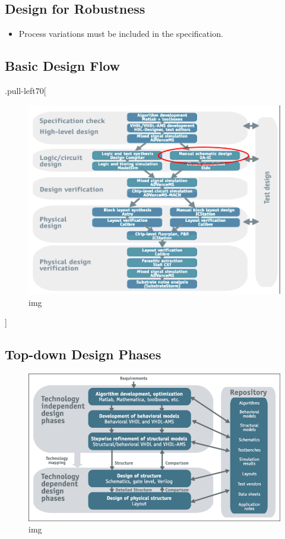 \documentclass[
]{article}
\providecommand{\tightlist}{%
  \setlength{\itemsep}{0pt}\setlength{\parskip}{0pt}}
\begin{document}
\hypertarget{design-for-robustness}{%
\subsection{Design for Robustness}\label{design-for-robustness}}

\begin{itemize}
\tightlist
\item
  Process variations must be included in the specification.
\end{itemize}

\hypertarget{basic-design-flow}{%
\subsection{Basic Design Flow}\label{basic-design-flow}}

.pull-left70{[}

\begin{figure}
\centering
\includegraphics{lec04.files/img005.png}
\caption{img}
\end{figure}

{]}

\hypertarget{top-down-design-phases}{%
\subsection{Top-down Design Phases}\label{top-down-design-phases}}

\begin{figure}
\centering
\includegraphics{lec04.files/img006.png}
\caption{img}
\end{figure}
\end{document}
